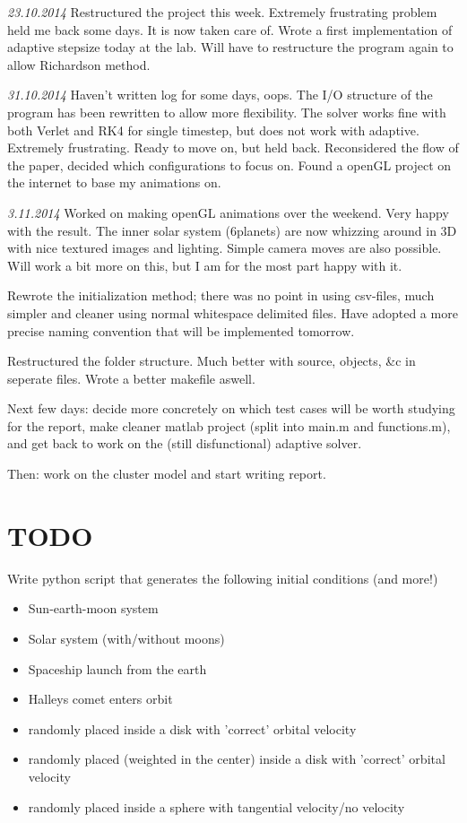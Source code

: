 \documentclass[11pt, oneside]{article}   	%
\begin{document}
\emph{23.10.2014}
Restructured the project this week. Extremely frustrating problem held me back some days. It is now taken care of. Wrote a first implementation of adaptive stepsize today at the lab. Will have to restructure the program again to allow Richardson method. 

\emph{31.10.2014}
Haven't written log for some days, oops. The I/O structure of the program has been rewritten to allow more flexibility. The solver works fine with both Verlet and RK4 for single timestep, but does not work with adaptive. Extremely frustrating. Ready to move on, but held back. Reconsidered the flow of the paper, decided which configurations to focus on. Found a openGL project on the internet to base my animations on.

\emph{3.11.2014}
Worked on making openGL animations over the weekend. Very happy with the result. The inner solar system (6planets) are now whizzing around in 3D with nice textured images and lighting. Simple camera moves are also possible. Will work a bit more on this, but I am for the most part happy with it. 

Rewrote the initialization method; there was no point in using csv-files, much simpler and cleaner using normal whitespace delimited files. Have adopted a more precise naming convention that will be implemented tomorrow. 

Restructured the folder structure. Much better with source, objects, \&c in seperate files. Wrote a better makefile aswell. 

Next few days: decide more concretely on which test cases will be worth studying for the report, make cleaner matlab project (split into main.m and functions.m), and get back  to work on the (still disfunctional) adaptive solver. 

Then: work on the cluster model and start writing report.  


\newpage

\section{TODO}


Write python script that generates the following initial conditions (and more!)
\begin{itemize}

\item Sun-earth-moon system
\item Solar system (with/without moons)
\item Spaceship launch from the earth
\item Halleys comet enters orbit

\item randomly placed inside a disk with 'correct' orbital velocity
\item randomly placed (weighted in the center) inside a disk with 'correct' orbital velocity
\item randomly placed inside a sphere with tangential velocity/no velocity

\end{itemize}
\end{document}
